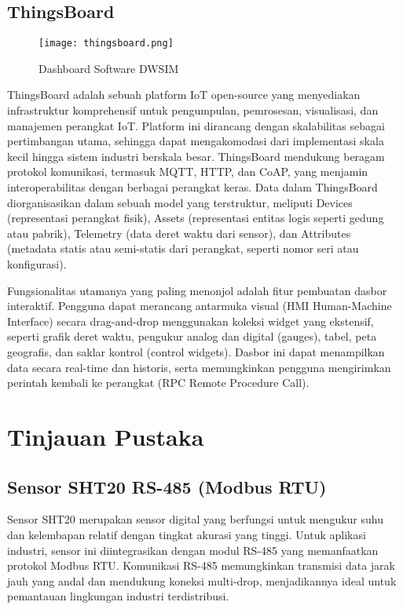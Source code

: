 \documentclass[a4paper, 12pt]{article}
\begin{document}
\subsection{ThingsBoard}

\begin{figure}[H]
    \centering
    \texttt{[image: thingsboard.png]} 
    \caption{Dashboard Software DWSIM} 
\end{figure}

ThingsBoard adalah sebuah platform IoT open-source yang menyediakan infrastruktur komprehensif untuk pengumpulan, pemrosesan, visualisasi, dan manajemen perangkat IoT. Platform ini dirancang dengan skalabilitas sebagai pertimbangan utama, sehingga dapat mengakomodasi dari implementasi skala kecil hingga sistem industri berskala besar. ThingsBoard mendukung beragam protokol komunikasi, termasuk MQTT, HTTP, dan CoAP, yang menjamin interoperabilitas dengan berbagai perangkat keras. Data dalam ThingsBoard diorganisasikan dalam sebuah model yang terstruktur, meliputi Devices (representasi perangkat fisik), Assets (representasi entitas logis seperti gedung atau pabrik), Telemetry (data deret waktu dari sensor), dan Attributes (metadata statis atau semi-statis dari perangkat, seperti nomor seri atau konfigurasi).

Fungsionalitas utamanya yang paling menonjol adalah fitur pembuatan dasbor interaktif. Pengguna dapat merancang antarmuka visual (HMI Human-Machine Interface) secara drag-and-drop menggunakan koleksi widget yang ekstensif, seperti grafik deret waktu, pengukur analog dan digital (gauges), tabel, peta geografis, dan saklar kontrol (control widgets). Dasbor ini dapat menampilkan data secara real-time dan historis, serta memungkinkan pengguna mengirimkan perintah kembali ke perangkat (RPC Remote Procedure Call).
\newpage

\section{Tinjauan Pustaka}

\subsection{Sensor SHT20 RS-485 (Modbus RTU)}
Sensor SHT20 merupakan sensor digital yang berfungsi untuk mengukur suhu dan kelembapan relatif dengan tingkat akurasi yang tinggi. Untuk aplikasi industri, sensor ini diintegrasikan dengan modul RS-485 yang memanfaatkan protokol Modbus RTU. Komunikasi RS-485 memungkinkan transmisi data jarak jauh yang andal dan mendukung koneksi multi-drop, menjadikannya ideal untuk pemantauan lingkungan industri terdistribusi.
\end{document}
